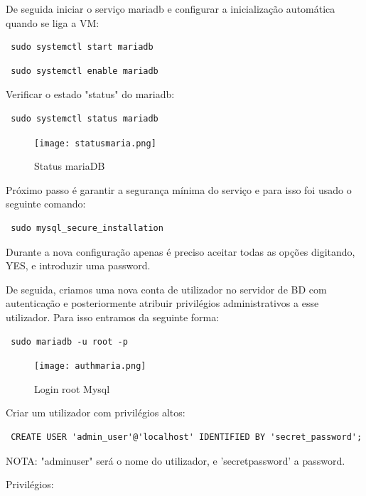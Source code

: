 De seguida iniciar o serviço mariadb e configurar a inicialização automática quando se liga a \ac{VM}:

\begin{verbatim} sudo systemctl start mariadb \end{verbatim}

\begin{verbatim} sudo systemctl enable mariadb \end{verbatim}

\newpage
Verificar o estado "status" do mariadb:

\begin{verbatim} sudo systemctl status mariadb \end{verbatim}

\begin{figure}[H]
\center
\texttt{[image: statusmaria.png]}
\caption{Status mariaDB}
\end{figure}

Próximo passo é garantir a segurança mínima do serviço e para isso foi usado o seguinte comando:

\begin{verbatim} sudo mysql_secure_installation \end{verbatim}

Durante a nova configuração apenas é preciso aceitar todas as opções digitando, YES, e introduzir uma password.

De seguida, criamos uma nova conta de utilizador no servidor de \ac{BD} com autenticação e posteriormente atribuir privilégios administrativos a esse utilizador. Para isso entramos da seguinte forma:

\begin{verbatim} sudo mariadb -u root -p \end{verbatim}

\begin{figure}[H]
\center
\texttt{[image: authmaria.png]}
\caption{Login root Mysql}
\end{figure}

\newpage
Criar um utilizador com privilégios altos:

\begin{verbatim} CREATE USER 'admin_user'@'localhost' IDENTIFIED BY 'secret_password'; \end{verbatim}

NOTA: "admin\textunderscore user" será o nome do utilizador, e 'secret\textunderscore password' a password.

Privilégios:

